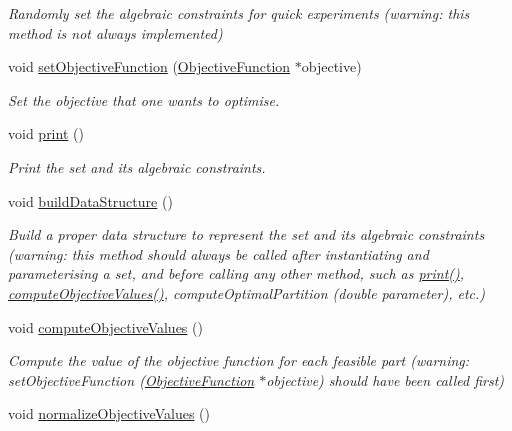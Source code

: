 \begin{DoxyCompactItemize}
\begin{DoxyCompactList}\small\item\em Randomly set the algebraic constraints for quick experiments (warning\-: this method is not always implemented) \end{DoxyCompactList}\item 
void \hyperlink{classMultiSet_a0c7e6fb6d2eb064cf6bf2fe7e810726a}{set\-Objective\-Function} (\hyperlink{classObjectiveFunction}{Objective\-Function} $\ast$objective)
\begin{DoxyCompactList}\small\item\em Set the objective that one wants to optimise. \end{DoxyCompactList}\item 
\hypertarget{classMultiSet_ab08f0a90d249cecc0f7931caa2632f48}{void \hyperlink{classMultiSet_ab08f0a90d249cecc0f7931caa2632f48}{print} ()}\label{classMultiSet_ab08f0a90d249cecc0f7931caa2632f48}

\begin{DoxyCompactList}\small\item\em Print the set and its algebraic constraints. \end{DoxyCompactList}\item 
\hypertarget{classMultiSet_aba70d435622c677be1223d652b038697}{void \hyperlink{classMultiSet_aba70d435622c677be1223d652b038697}{build\-Data\-Structure} ()}\label{classMultiSet_aba70d435622c677be1223d652b038697}

\begin{DoxyCompactList}\small\item\em Build a proper data structure to represent the set and its algebraic constraints (warning\-: this method should always be called after instantiating and parameterising a set, and before calling any other method, such as \hyperlink{classMultiSet_ab08f0a90d249cecc0f7931caa2632f48}{print()}, \hyperlink{classMultiSet_a3818a284a0b82daef5daec126bbc402b}{compute\-Objective\-Values()}, compute\-Optimal\-Partition (double parameter), etc.) \end{DoxyCompactList}\item 
\hypertarget{classMultiSet_a3818a284a0b82daef5daec126bbc402b}{void \hyperlink{classMultiSet_a3818a284a0b82daef5daec126bbc402b}{compute\-Objective\-Values} ()}\label{classMultiSet_a3818a284a0b82daef5daec126bbc402b}

\begin{DoxyCompactList}\small\item\em Compute the value of the objective function for each feasible part (warning\-: set\-Objective\-Function (\hyperlink{classObjectiveFunction}{Objective\-Function} $\ast$objective) should have been called first) \end{DoxyCompactList}\item 
\hypertarget{classMultiSet_a67169c2a6ee3b807ddbda0a6a67372a9}{void \hyperlink{classMultiSet_a67169c2a6ee3b807ddbda0a6a67372a9}{normalize\-Objective\-Values} ()}\label{classMultiSet_a67169c2a6ee3b807ddbda0a6a67372a9}


\end{DoxyCompactItemize}
